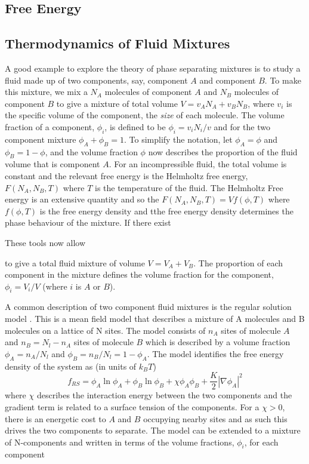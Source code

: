 \subsection{Free Energy}
\subsection{Thermodynamics of Fluid Mixtures}

A good example to explore the theory of phase separating mixtures is to study a fluid made up of two components, say, component $A$ and component $B$. To make this mixture, we mix a $N_A$ molecules of component $A$ and $N_B$ molecules of component $B$ to give a mixture of total volume $V = v_A N_A + v_B N_B$, where $v_i$ is the specific volume of the component, the \textit{size} of each molecule. The volume fraction of a component, $\phi_i$, is defined to be $\phi_i = v_i N_i/v$ and for the two component mixture $\phi_A+\phi_B = 1$. To simplify the notation, let $\phi_A=\phi$ and $\phi_B=1-\phi$, and the volume fraction $\phi$ now describes the proportion of the fluid volume that is component $A$. For an incompressible fluid, the total volume is constant and the relevant free energy is the Helmholtz free energy, $F(N_A, N_B, T)$ where $T$ is the temperature of the fluid. The Helmholtz Free energy is an extensive quantity and so the $F(N_A, N_B, T) = V f(\phi, T)$ where $f(\phi, T)$ is the free energy density and tthe free energy density determines the phase behaviour of the mixture. If there exist

These tools now allow 

\beginfigure

to give a total fluid mixture of volume $V=V_A + V_B$. The proportion of each component in the mixture defines the volume fraction for the component, $\phi_i = V_i/V$ (where $i$ is $A$ or $B$).

A common description of two component fluid mixtures is the regular solution model \cite{jones2002soft}. This is a mean field model that describes a mixture of A molecules and B molecules on a lattice of N sites. The model consists of $n_A$ sites of molecule $A$ and $n_B=N_l-n_A$ sites of molecule $B$ which is described by a volume fraction $\phi_A = n_A/N_l$ and $\phi_B = n_B/N_l = 1-\phi_A$. The model identifies the free energy density of the system as (in units of $k_BT$)
\begin{equation}
    f_{RS} = \phi_A\ln\phi_A+\phi_B\ln\phi_B + \chi\phi_A\phi_B + \frac{K}{2}|\nabla\phi_A|^2
\end{equation}
where $\chi$ describes the interaction energy between the two components and the gradient term is related to a surface tension of the components. For a $\chi > 0$, there is an energetic cost to $A$ and $B$ occupying nearby sites and as such this drives the two components to separate. The model can be extended to a mixture of N-components and written in terms of the volume fractions, $\phi_i$, for each component

